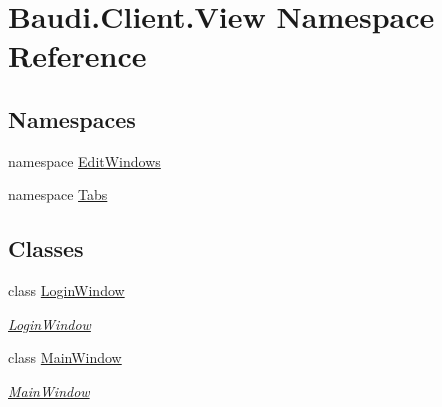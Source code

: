 \hypertarget{namespace_baudi_1_1_client_1_1_view}{}\section{Baudi.\+Client.\+View Namespace Reference}
\label{namespace_baudi_1_1_client_1_1_view}
\subsection*{Namespaces}
\begin{DoxyCompactItemize}
\item 
namespace \hyperlink{namespace_baudi_1_1_client_1_1_view_1_1_edit_windows}{Edit\+Windows}
\item 
namespace \hyperlink{namespace_baudi_1_1_client_1_1_view_1_1_tabs}{Tabs}
\end{DoxyCompactItemize}
\subsection*{Classes}
\begin{DoxyCompactItemize}
\item 
class \hyperlink{class_baudi_1_1_client_1_1_view_1_1_login_window}{Login\+Window}
\begin{DoxyCompactList}\small\item\em \hyperlink{class_baudi_1_1_client_1_1_view_1_1_login_window}{Login\+Window} \end{DoxyCompactList}\item 
class \hyperlink{class_baudi_1_1_client_1_1_view_1_1_main_window}{Main\+Window}
\begin{DoxyCompactList}\small\item\em \hyperlink{class_baudi_1_1_client_1_1_view_1_1_main_window}{Main\+Window} \end{DoxyCompactList}\end{DoxyCompactItemize}
